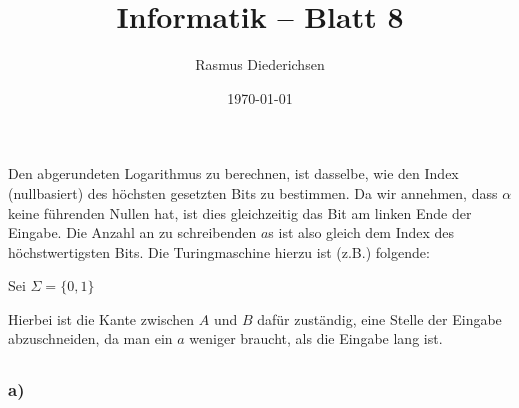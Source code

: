 \documentclass{article}
\title{Informatik \rotatebox[origin=c]{180}{D}\raisebox{2pt}{:} -- Blatt 8}
\author{Rasmus Diederichsen}
\date{\today}
\begin{document}
\maketitle

\section{} 
\subsection{} 

Den abgerundeten Logarithmus zu berechnen, ist dasselbe, wie den Index
(nullbasiert) des höchsten gesetzten Bits zu bestimmen. Da wir annehmen, dass
$\alpha$ keine führenden Nullen hat, ist dies gleichzeitig das Bit am linken
Ende der Eingabe. Die Anzahl an zu schreibenden $a$s ist also gleich dem Index
des höchstwertigsten Bits. Die Turingmaschine hierzu ist (z.B.) folgende:

\usetikzlibrary{automata,positioning,arrows}

\vspace{\baselineskip}

\colorbox{teal!10}{Sei $\Sigma=\{0,1\}$}
\begin{center}
\end{center}

Hierbei ist die Kante zwischen $A$ und $B$ dafür zuständig, eine Stelle der
Eingabe abzuschneiden, da man ein $a$ weniger braucht, als die Eingabe lang ist.

\subsection{} 
\subsubsection{a)}
\end{document}
